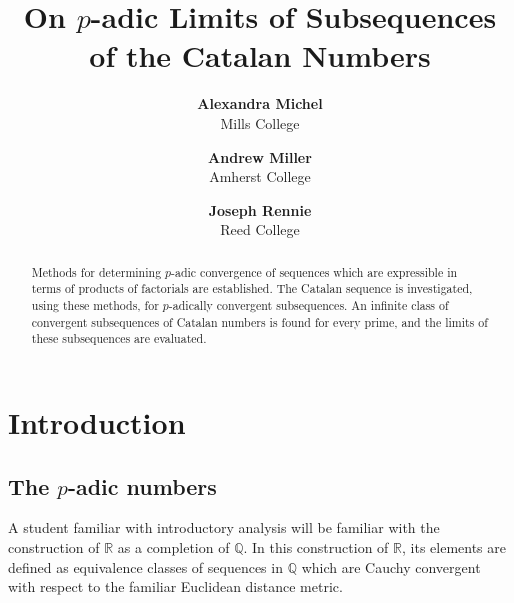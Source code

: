 \documentclass[12pt, letter]{article}    %
\title{On $p$-adic Limits of Subsequences of the Catalan Numbers}
\author{
\textbf{Alexandra Michel}\\ \small{Mills College} \and
\textbf{Andrew Miller}\\ \small{Amherst College} \and
\textbf{Joseph Rennie}\\ \small{Reed College}}
\theoremstyle{plain}
\theoremstyle{definition}
\numberwithin{equation}{section}
\begin{document}
\maketitle                 %

 
\begin{abstract}


Methods for determining $p$-adic convergence of sequences which are expressible in terms of products of factorials are established. The Catalan sequence is investigated, using these methods, for $p$-adically convergent subsequences. An infinite class of convergent subsequences of Catalan numbers is found for every prime, and the limits of these subsequences are evaluated.

\end{abstract}

\section{Introduction}
\subsection{The $p$-adic numbers}

\indent A student familiar with introductory analysis will be familiar with the construction of $\mathbb{R}$ as a completion of $\mathbb{Q}$. In this construction of $\mathbb{R}$, its elements are defined as equivalence classes of sequences in $\mathbb{Q}$ which are Cauchy convergent with respect to the familiar Euclidean distance metric.  
\end{document}
